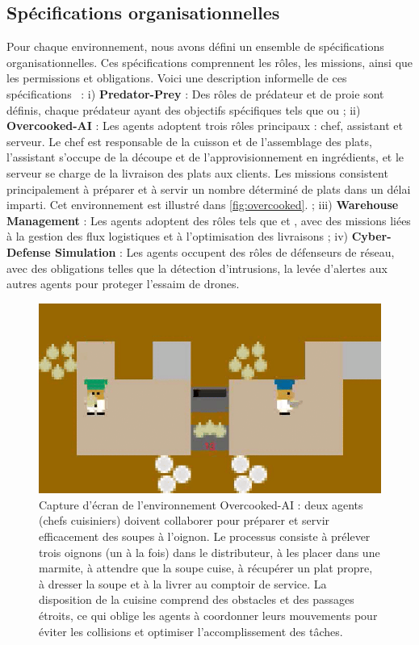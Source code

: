\documentclass[francais,ROIA,Unicode,manuscript]{cedram}
\begin{document}
\subsection{Spécifications organisationnelles}

Pour chaque environnement, nous avons défini un ensemble de spécifications organisationnelles. Ces spécifications comprennent les rôles, les missions, ainsi que les permissions et obligations. Voici une description informelle de ces spécifications~\hyperref[fn:github]{\footnotemark[1]} :
%
i) \textbf{Predator-Prey} : Des rôles de prédateur et de proie sont définis, chaque prédateur ayant des objectifs spécifiques tels que  ou 
; \quad
ii) \textbf{Overcooked-AI} : Les agents adoptent trois rôles principaux : chef, assistant et serveur. Le chef est responsable de la cuisson et de l'assemblage des plats, l'assistant s'occupe de la découpe et de l'approvisionnement en ingrédients, et le serveur se charge de la livraison des plats aux clients. Les missions consistent principalement à préparer et à servir un nombre déterminé de plats dans un délai imparti. Cet environnement est illustré dans \autoref{fig:overcooked}.
; \quad
iii) \textbf{Warehouse Management} : Les agents adoptent des rôles tels que  et , avec des missions liées à la gestion des flux logistiques et à l'optimisation des livraisons
; \quad
iv) \textbf{Cyber-Defense Simulation} : Les agents occupent des rôles de défenseurs de réseau, avec des obligations telles que la détection d'intrusions, la levée d'alertes aux autres agents pour proteger l'essaim de drones.

\begin{figure}[h!]
    \centering
    \includegraphics[trim=0cm -0.5cm 0cm -0.5cm, clip, width=0.9\linewidth]{figures/overcooked.png}
    \caption[Capture d'écran de l'environnement Overcooked-AI]{Capture d'écran de l'environnement Overcooked-AI : deux agents (chefs cuisiniers) doivent collaborer pour préparer et servir efficacement des soupes à l'oignon. Le processus consiste à prélever trois oignons (un à la fois) dans le distributeur, à les placer dans une marmite, à attendre que la soupe cuise, à récupérer un plat propre, à dresser la soupe et à la livrer au comptoir de service. La disposition de la cuisine comprend des obstacles et des passages étroits, ce qui oblige les agents à coordonner leurs mouvements pour éviter les collisions et optimiser l'accomplissement des tâches.}
    \label{fig:overcooked}
\end{figure}
\end{document}
